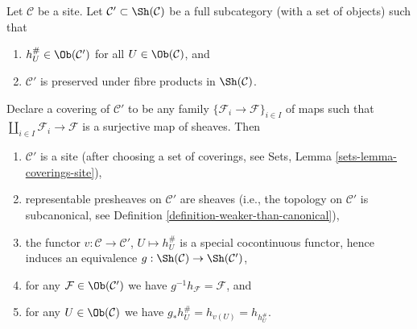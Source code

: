 \begin{lemma}
\label{lemma-special-equivalence}
Let $\mathcal{C}$ be a site. Let
$\mathcal{C}' \subset \Sh(\mathcal{C})$
be a full subcategory (with a set of objects) such that
\begin{enumerate}
\item $h_U^\# \in \Ob(\mathcal{C}')$ for all
$U \in \Ob(\mathcal{C})$, and
\item $\mathcal{C}'$ is preserved under fibre products in
$\Sh(\mathcal{C})$.
\end{enumerate}
Declare a covering of $\mathcal{C}'$ to be any family
$\{\mathcal{F}_i \to \mathcal{F}\}_{i \in I}$ of maps such that
$\coprod_{i \in I} \mathcal{F}_i \to \mathcal{F}$ is a surjective
map of sheaves. Then
\begin{enumerate}
\item $\mathcal{C}'$ is a site (after
choosing a set of coverings, see Sets, Lemma \ref{sets-lemma-coverings-site}),
\item representable presheaves on $\mathcal{C}'$ are sheaves
(i.e., the topology on $\mathcal{C}'$ is subcanonical, see
Definition \ref{definition-weaker-than-canonical}),
\item the functor $v : \mathcal{C} \to \mathcal{C}'$,
$U \mapsto h_U^\#$ is a special cocontinuous functor, hence induces an
equivalence $g : \Sh(\mathcal{C}) \to \Sh(\mathcal{C}')$,
\item for any $\mathcal{F} \in \Ob(\mathcal{C}')$ we have
$g^{-1}h_\mathcal{F} = \mathcal{F}$, and
\item for any $U \in \Ob(\mathcal{C})$ we have
$g_*h_U^\# = h_{v(U)} = h_{h_U^\#}$.
\end{enumerate}
\end{lemma}

